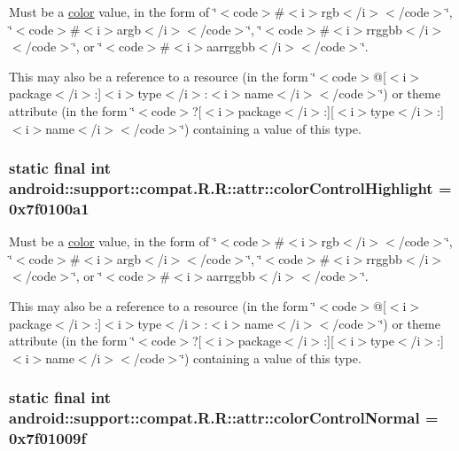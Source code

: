 Must be a \hyperlink{classandroid_1_1support_1_1compat_1_1_r_1_1color}{color} value, in the form of \char`\"{}$<$code$>$\#$<$i$>$rgb$<$/i$>$$<$/code$>$\char`\"{}, \char`\"{}$<$code$>$\#$<$i$>$argb$<$/i$>$$<$/code$>$\char`\"{}, \char`\"{}$<$code$>$\#$<$i$>$rrggbb$<$/i$>$$<$/code$>$\char`\"{}, or \char`\"{}$<$code$>$\#$<$i$>$aarrggbb$<$/i$>$$<$/code$>$\char`\"{}. 

This may also be a reference to a resource (in the form \char`\"{}$<$code$>$@\mbox{[}$<$i$>$package$<$/i$>$:\mbox{]}$<$i$>$type$<$/i$>$:$<$i$>$name$<$/i$>$$<$/code$>$\char`\"{}) or theme attribute (in the form \char`\"{}$<$code$>$?\mbox{[}$<$i$>$package$<$/i$>$:\mbox{]}\mbox{[}$<$i$>$type$<$/i$>$:\mbox{]}$<$i$>$name$<$/i$>$$<$/code$>$\char`\"{}) containing a value of this type. \hypertarget{classandroid_1_1support_1_1compat_1_1_r_1_1attr_b27aa47e218d26eb0cdcc7ec1b2b3838}{
\subsubsection[{colorControlHighlight}]{\setlength{\rightskip}{0pt plus 5cm}static final int android::support::compat.R.R::attr::colorControlHighlight = 0x7f0100a1}}
\label{classandroid_1_1support_1_1compat_1_1_r_1_1attr_b27aa47e218d26eb0cdcc7ec1b2b3838}


Must be a \hyperlink{classandroid_1_1support_1_1compat_1_1_r_1_1color}{color} value, in the form of \char`\"{}$<$code$>$\#$<$i$>$rgb$<$/i$>$$<$/code$>$\char`\"{}, \char`\"{}$<$code$>$\#$<$i$>$argb$<$/i$>$$<$/code$>$\char`\"{}, \char`\"{}$<$code$>$\#$<$i$>$rrggbb$<$/i$>$$<$/code$>$\char`\"{}, or \char`\"{}$<$code$>$\#$<$i$>$aarrggbb$<$/i$>$$<$/code$>$\char`\"{}. 

This may also be a reference to a resource (in the form \char`\"{}$<$code$>$@\mbox{[}$<$i$>$package$<$/i$>$:\mbox{]}$<$i$>$type$<$/i$>$:$<$i$>$name$<$/i$>$$<$/code$>$\char`\"{}) or theme attribute (in the form \char`\"{}$<$code$>$?\mbox{[}$<$i$>$package$<$/i$>$:\mbox{]}\mbox{[}$<$i$>$type$<$/i$>$:\mbox{]}$<$i$>$name$<$/i$>$$<$/code$>$\char`\"{}) containing a value of this type. \hypertarget{classandroid_1_1support_1_1compat_1_1_r_1_1attr_0b2707a6f9d6ca383d5f56a4199ca049}{
\subsubsection[{colorControlNormal}]{\setlength{\rightskip}{0pt plus 5cm}static final int android::support::compat.R.R::attr::colorControlNormal = 0x7f01009f}}
\label{classandroid_1_1support_1_1compat_1_1_r_1_1attr_0b2707a6f9d6ca383d5f56a4199ca049}



